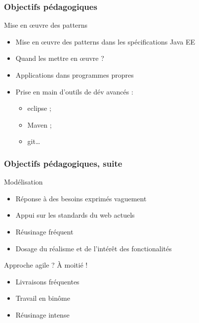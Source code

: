\documentclass[english, french]{beamer}
\begin{document}
\begin{frame}
	\frametitle{Objectifs pédagogiques}
	\begin{block}{Mise en œuvre des patterns}
		\begin{itemize}
		\item Mise en œuvre des patterns dans les spécifications Java EE
		\item Quand les mettre en œuvre ?
		\item Applications dans programmes propres
		\end{itemize}
	\end{block}
	\begin{itemize}
		\item Prise en main d’outils de dév avancés : 
		\begin{itemize}
			\item eclipse ;
			\item Maven ;
			\item git…
		\end{itemize}
	\end{itemize}
\end{frame}

\begin{frame}
	\frametitle{Objectifs pédagogiques, suite}
	\begin{block}{Modélisation}
		\begin{itemize}
		\item Réponse à des besoins exprimés vaguement
		\item Appui sur les standards du web actuels
		\item Réusinage fréquent
		\item Dosage du réalisme et de l’intérêt des fonctionalités
		\end{itemize}
	\end{block}
	Approche agile ? À moitié !
	\begin{itemize}
		\item Livraisons fréquentes
		\item Travail en binôme
		\item Réusinage intense
	\end{itemize}
\end{frame}
\end{document}
